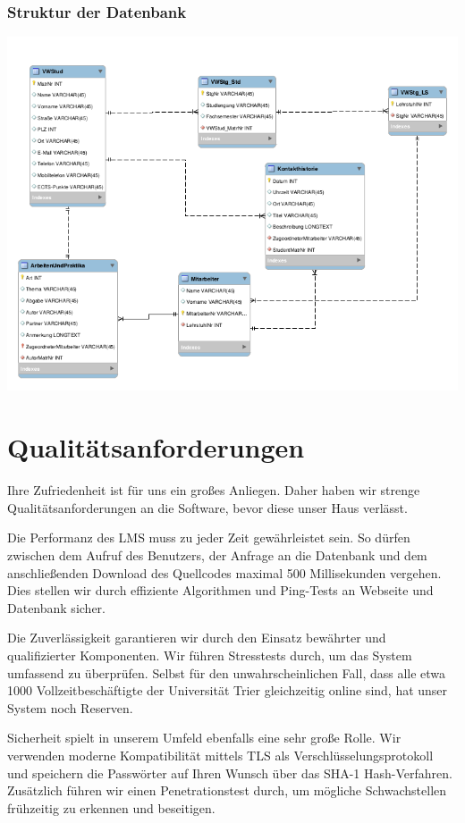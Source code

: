 \documentclass[10pt,a4paper]{article}
\begin{document}
\subsubsection{Struktur der Datenbank}
\hspace{-60pt}
\includegraphics[scale=.75]{Datenbank.png}

\section{Qualitätsanforderungen}
Ihre Zufriedenheit ist für uns ein großes Anliegen. Daher haben wir strenge Qualitätsanforderungen an die Software, bevor diese unser Haus verlässt.

Die Performanz des LMS muss zu jeder Zeit gewährleistet sein. So dürfen zwischen dem Aufruf des Benutzers, der Anfrage an die Datenbank und dem anschließenden Download des Quellcodes maximal 500 Millisekunden vergehen. Dies stellen wir durch effiziente Algorithmen und Ping-Tests an Webseite und Datenbank sicher.

Die Zuverlässigkeit garantieren wir durch den Einsatz bewährter und qualifizierter Komponenten. Wir führen Stresstests durch, um das System umfassend zu überprüfen. Selbst für den unwahrscheinlichen Fall, dass alle etwa 1000 Vollzeitbeschäftigte der Universität Trier gleichzeitig online sind, hat unser System noch Reserven.

Sicherheit spielt in unserem Umfeld ebenfalls eine sehr große Rolle. Wir verwenden moderne Kompatibilität mittels TLS als Verschlüsselungsprotokoll und speichern die Passwörter auf Ihren Wunsch über das SHA-1 Hash-Verfahren. Zusätzlich führen wir einen Penetrationstest durch, um mögliche Schwachstellen frühzeitig zu erkennen und beseitigen.
\end{document}
